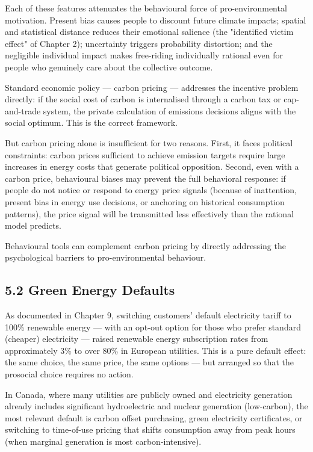 \documentclass[12pt, letterpaper]{article}
\begin{document}
Each of these features attenuates the behavioural force of pro-environmental motivation. Present bias causes people to discount future climate impacts; spatial and statistical distance reduces their emotional salience (the "identified victim effect" of Chapter 2); uncertainty triggers probability distortion; and the negligible individual impact makes free-riding individually rational even for people who genuinely care about the collective outcome.

Standard economic policy --- carbon pricing --- addresses the incentive problem directly: if the social cost of carbon is internalised through a carbon tax or cap-and-trade system, the private calculation of emissions decisions aligns with the social optimum. This is the correct framework.

But carbon pricing alone is insufficient for two reasons. First, it faces political constraints: carbon prices sufficient to achieve emission targets require large increases in energy costs that generate political opposition. Second, even with a carbon price, behavioural biases may prevent the full behavioral response: if people do not notice or respond to energy price signals (because of inattention, present bias in energy use decisions, or anchoring on historical consumption patterns), the price signal will be transmitted less effectively than the rational model predicts.

Behavioural tools can complement carbon pricing by directly addressing the psychological barriers to pro-environmental behaviour.


\subsection{5.2 Green Energy Defaults}


As documented in Chapter 9, switching customers' default electricity tariff to 100\% renewable energy --- with an opt-out option for those who prefer standard (cheaper) electricity --- raised renewable energy subscription rates from approximately 3\% to over 80\% in European utilities. This is a pure default effect: the same choice, the same price, the same options --- but arranged so that the prosocial choice requires no action.

In Canada, where many utilities are publicly owned and electricity generation already includes significant hydroelectric and nuclear generation (low-carbon), the most relevant default is carbon offset purchasing, green electricity certificates, or switching to time-of-use pricing that shifts consumption away from peak hours (when marginal generation is most carbon-intensive).
\end{document}
